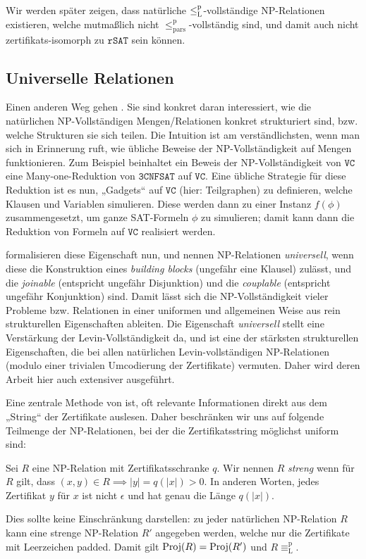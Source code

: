 Wir werden später zeigen, dass natürliche $\leq_\mathrm{L}^\mathrm{p}$-vollständige NP-Relationen existieren, welche  mutmaßlich nicht $\leq_\mathrm{pars}^\mathrm p$-vollständig sind, und damit auch nicht zertifikats-isomorph zu $\mathtt{rSAT}$ sein können.

\subsection*{Universelle Relationen}

Einen anderen Weg gehen \textcite{agrawal_universal_1992}. Sie sind konkret daran interessiert, wie die natürlichen NP-Vollständigen Mengen/Relationen konkret strukturiert sind, bzw. welche Strukturen sie sich teilen. 
Die Intuition ist am verständlichsten, wenn man sich in Erinnerung ruft, wie übliche Beweise der NP-Vollständigkeit auf Mengen funktionieren.
Zum Beispiel beinhaltet ein Beweis der NP-Vollständigkeit von $\mathtt{VC}$ eine Many-one-Reduktion von $\mathtt{3CNFSAT}$ auf $\mathtt{VC}$. 
Eine übliche Strategie für diese Reduktion ist es nun, „Gadgets“ auf $\mathtt{VC}$ (hier: Teilgraphen) zu definieren, welche Klausen und Variablen simulieren. Diese werden dann zu einer Instanz $f(\phi)$ zusammengesetzt, um ganze SAT-Formeln $\phi$ zu simulieren; damit kann dann die Reduktion von Formeln auf $\mathtt{VC}$ realisiert werden.

\citeauthor{agrawal_universal_1992} formalisieren diese Eigenschaft nun, und nennen NP-Relationen \emph{universell}, wenn diese die Konstruktion eines \emph{building blocks} (ungefähr eine Klausel) zulässt, und die \emph{joinable} (entspricht ungefähr Disjunktion) und die \emph{couplable} (entspricht ungefähr Konjunktion) sind. Damit lässt sich die NP-Vollständigkeit vieler Probleme bzw. Relationen in einer uniformen und allgemeinen Weise aus rein strukturellen Eigenschaften ableiten. 
Die Eigenschaft \emph{universell} stellt eine Verstärkung der Levin-Vollständigkeit da, und ist eine der stärksten strukturellen Eigenschaften, die \citeauthor{agrawal_universal_1992} bei allen natürlichen Levin-vollständigen NP-Relationen (modulo einer trivialen Umcodierung der Zertifikate) vermuten. Daher wird deren Arbeit hier auch extensiver ausgeführt.

Eine zentrale Methode von \citeauthor{agrawal_universal_1992} ist, oft relevante Informationen direkt aus dem „String“ der Zertifikate auslesen. Daher beschränken wir uns auf folgende Teilmenge der NP-Relationen, bei der die Zertifikatsstring möglichst uniform sind: 
\begin{definition}
    Sei $R$ eine NP-Relation mit Zertifikatsschranke $q$. 
    Wir nennen $R$ \emph{streng} wenn für $R$ gilt, dass $(x,y)\in R\implies |y|=q(|x|)>0$. In anderen Worten, jedes Zertifikat $y$ für $x$ ist nicht $\epsilon$ und hat genau die Länge $q(|x|)$.
\end{definition}
Dies sollte keine Einschränkung darstellen: zu jeder natürlichen NP-Relation $R$ kann eine strenge NP-Relation $R'$ angegeben werden, welche nur die Zertifikate mit Leerzeichen padded. Damit gilt $\operatorname{Proj}(R)=\operatorname{Proj}(R')$ und $R\equiv_\mathrm L^\mathrm p$.

